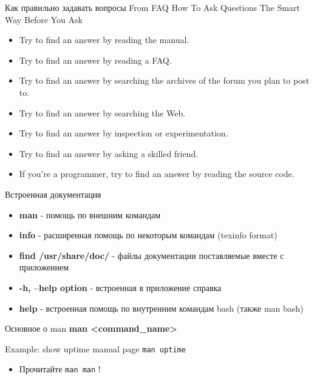 \begin{frame}[fragile]{Как правильно задавать вопросы}
From FAQ How To Ask Questions The Smart Way
Before You Ask
  \begin{itemize}
	  \item Try to find an answer by reading the manual.
	  \item Try to find an answer by reading a FAQ.
	  \item Try to find an answer by searching the archives of the forum you plan to post to.
	  \item Try to find an answer by searching the Web.
	  \item Try to find an answer by inspection or experimentation.
	  \item Try to find an answer by asking a skilled friend.
	  \item If you're a programmer, try to find an answer by reading the source code.
    \end{itemize}
\end{frame}


\begin{frame}[fragile]{Встроенная документация}
\begin{itemize}
    \item \textbf{man} - помощь по внешним командам
    \pause
    \item \textbf{info} - расширенная помощь по некоторым командам (texinfo format)
    \pause
    \item \textbf{find /usr/share/doc/} - файлы документации поставляемые вместе с приложением
    \item \textbf{-h, --help option} - встроенная в приложение справка
    \item \textbf{help} - встроенная помощь по внутренним командам bash (также man bash)
\end{itemize}
\end{frame}

\begin{frame}[fragile]{Основное о man}
      \textbf{man \textless command\_name\textgreater }

	\begin{block}{Example: show uptime manual page}
		{\tt man uptime}
	\end{block}

		\begin{itemize}
			\item Прочитайте {\tt man man} !
		\end{itemize}

\end{frame}

